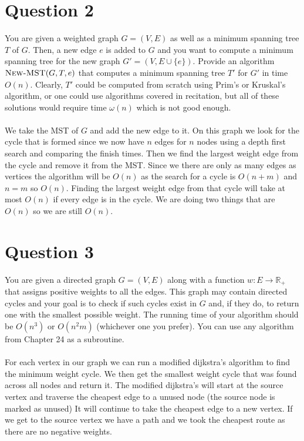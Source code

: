 \documentclass{article}
\begin{document}
\section*{Question 2}
You are given a weighted graph $G=(V, E)$ as well as a minimum spanning tree $T$ of $G$.
Then, a new edge $e$ is added to $G$ and you want to compute a minimum spanning tree for the new graph $G'=(V, E\cup\{e\})$.
Provide an algorithm $\textsc{New-MST}(G,T,e)$ that computes a minimum spanning tree $T'$ for $G'$ in time $O(n)$.
Clearly, $T'$ could be computed from scratch using Prim's or Kruskal's algorithm, or one could use algorithms covered in recitation, but all of these solutions would require time $\omega(n)$ which is not good enough.
\\
\\
We take the MST of $G$ and add the new edge to it.
On this graph we look for the cycle that is formed since we now have $n$ edges for $n$ nodes using a depth first search and comparing the finish times.
Then we find the largest weight edge from the cycle and remove it from the MST.
Since we there are only as many edges as vertices the algorithm will be $O(n)$ as the search for a cycle is $O(n+m)$ and $n=m$ so $O(n)$.
Finding the largest weight edge from that cycle will take at most $O(n)$ if every edge is in the cycle.
We are doing two things that are $O(n)$ so we are still $O(n)$.

\section*{Question 3}
You are given a directed graph $G=(V,E)$ along with a function $w:E\to \mathbb{R_+}$ that assigns positive weights to all the edges.
This graph may contain directed cycles and your goal is to check if such cycles exist in $G$ and, if they do, to return one with the smallest possible weight.
The running time of your algorithm should be $O(n^3)$ or $O(n^2m)$ (whichever one you prefer).
You can use any algorithm from Chapter 24 as a subroutine.
\\
\\
For each vertex in our graph we can run a modified dijkstra's algorithm to find the minimum weight cycle.
We then get the smallest weight cycle that was found across all nodes and return it.
The modified dijkstra's will start at the source vertex and traverse the cheapest edge to a unused node (the source node is marked as unused)
It will continue to take the cheapest edge to a new vertex.
If we get to the source vertex we have a path and we took the cheapest route as there are no negative weights.
\end{document}
